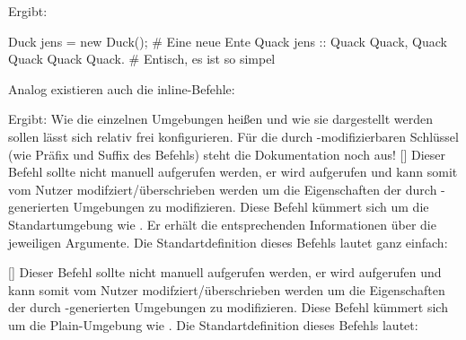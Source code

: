 Ergibt:
\begin{rubberduck}
Duck jens = new Duck(); # Eine neue Ente
Quack jens ::{
    Quack Quack, Quack Quack
    Quack Quack. # Entisch, es ist so simpel
}
\end{rubberduck}
Analog existieren auch die inline-Befehle:
\begin{latex*}[morekeywords={[5]{\\prubberduck}}]
\end{latex*}
Ergibt: 
\medskip\newline
Wie die einzelnen Umgebungen heißen und wie sie dargestellt werden sollen lässt sich relativ frei konfigurieren. Für die durch -modifizierbaren Schlüssel (wie Präfix und Suffix des Befehls) steht die Dokumentation noch aus!\newline
%
%
%
[]
Dieser Befehl sollte nicht manuell aufgerufen werden, er wird aufgerufen und kann somit vom Nutzer modifziert/überschrieben werden um die Eigenschaften der durch -generierten Umgebungen zu modifizieren. Diese Befehl kümmert sich um die Standartumgebung wie . Er erhält die entsprechenden Informationen über die jeweiligen Argumente. Die Standartdefinition dieses Befehls lautet ganz einfach:
%
%
%
[\secline{}]
Dieser Befehl sollte nicht manuell aufgerufen werden, er wird aufgerufen und kann somit vom Nutzer modifziert/überschrieben werden um die Eigenschaften der durch -generierten Umgebungen zu modifizieren. Diese Befehl kümmert sich um die Plain-Umgebung wie .
Die Standartdefinition dieses Befehls lautet:
